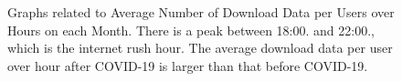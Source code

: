 \begin{figure}[t]
  \hspace{0.2cm}
        
  \caption{Graphs related to Average Number of Download Data per Users over Hours on each Month. There is a peak between 18:00. and 22:00., which is the internet rush hour. The average download data per user over hour after COVID-19 is larger than that before COVID-19.}
  \label{fig:download-data-per-user-hours-fig} 
\end{figure}




